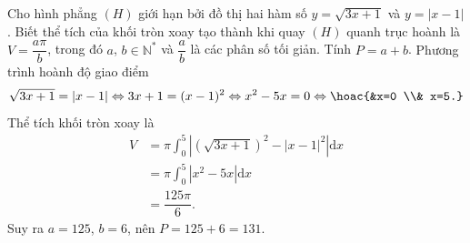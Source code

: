 \begin{ex}%
Cho hình phẳng $(H)$ giới hạn bởi đồ thị hai hàm số $y=\sqrt{3 x+1}$ và $y=|x-1|$. Biết thể tích của khối tròn xoay tạo thành khi quay $(H)$ quanh trục hoành là $V=\dfrac{a \pi}{b}$, trong đó $a$, $b \in \mathbb{N}^{*}$ và $\dfrac{a}{b}$ là các phân số tối giản. Tính $P=a+b$.
\loigiai
{Phương trình hoành độ giao điểm \[\sqrt{3 x+1}=|x-1| \Leftrightarrow 3 x+1=(x-1)^{2} \Leftrightarrow x^{2}-5 x=0 \Leftrightarrow
\hoac{&x=0 \\& x=5.}
\]
Thể tích khối tròn xoay là
\begin{align*}
V&=\pi \displaystyle\int_{0}^{5}\left|(\sqrt{3 x+1})^{2}-\left| x-1\right|^{2}\right|\mathrm{d}x\\
&=\pi \displaystyle\int_{0}^{5}\left| x^{2}-5 x \right| \mathrm{d}x\\
&=\dfrac{125 \pi}{6}.
\end{align*}
Suy ra $a=125$, $b=6$, nên $P=125+6=131$.
}
\end{ex}

